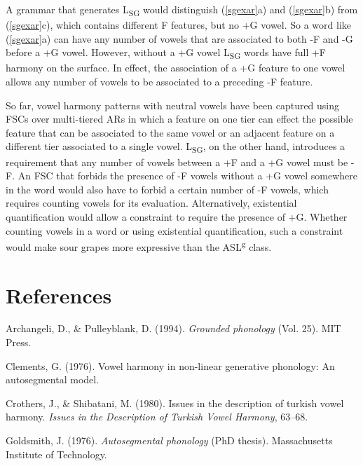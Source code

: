 \documentclass[,doc,floatsintext]{apa6}
\theoremstyle{definition}
\theoremstyle{definition}
\theoremstyle{definition}
\theoremstyle{remark}
\begin{document}
A grammar that generates L\textsubscript{SG} would distinguish
(\ref{sgexar}a) and (\ref{sgexar}b) from (\ref{sgexar}c), which contains
different F features, but no +G vowel. So a word like (\ref{sgexar}a)
can have any number of vowels that are associated to both -F and -G
before a +G vowel. However, without a +G vowel L\textsubscript{SG} words
have full +F harmony on the surface. In effect, the association of a +G
feature to one vowel allows any number of vowels to be associated to a
preceding -F feature.

So far, vowel harmony patterns with neutral vowels have been captured
using FSCs over multi-tiered ARs in which a feature on one tier can
effect the possible feature that can be associated to the same vowel or
an adjacent feature on a different tier associated to a single vowel.
L\textsubscript{SG}, on the other hand, introduces a requirement that
any number of vowels between a +F and a +G vowel must be -F. An FSC that
forbids the presence of -F vowels without a +G vowel somewhere in the
word would also have to forbid a certain number of -F vowels, which
requires counting vowels for its evaluation. Alternatively, existential
quantification would allow a constraint to require the presence of +G.
Whether counting vowels in a word or using existential quantification,
such a constraint would make sour grapes more expressive than the
ASL\textsuperscript{g} class.

\newpage

\section{References}\label{references}

\setlength{\parindent}{-0.5in} \setlength{\leftskip}{0.5in}

\hypertarget{refs}{}
\hypertarget{ref-archangelipulleyblank1994}{}
Archangeli, D., \& Pulleyblank, D. (1994). \emph{Grounded phonology}
(Vol. 25). MIT Press.

\hypertarget{ref-Clements1976}{}
Clements, G. (1976). Vowel harmony in non-linear generative phonology:
An autosegmental model.

\hypertarget{ref-crothersshibatani1980}{}
Crothers, J., \& Shibatani, M. (1980). Issues in the description of
turkish vowel harmony. \emph{Issues in the Description of Turkish Vowel
Harmony}, 63--68.

\hypertarget{ref-Goldsmith1976}{}
Goldsmith, J. (1976). \emph{Autosegmental phonology} (PhD thesis).
Massachusetts Institute of Technology.
\end{document}
